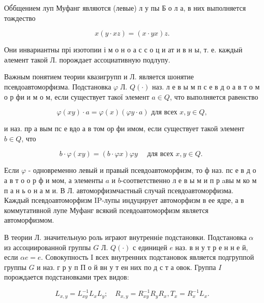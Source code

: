 \documentclass[10pt]{article}
\begin{document}
Об́бщением луп Муфанг являются (левые) л у пы Б о л а, в них выполняется тождество



\[

x(y \cdot x z)=(x \cdot y x) z .

\]



Они инвариантны прі изотопии і м о н о а с с о ц и ат и в н ы, т. е. каждыӥ әлемент такой Л. порождает ассоциативную подлупу.



Важным понятием теории квазигрупп и Л. является шонятие псевдоавтоморфизма. Подстановка $\varphi$ Л. $Q(\cdot)$ наз. л е в ы м п с е в д о а в т о м о р фи и м о м, если существует такої элемент $a \in Q$, что выполняется равенство



\[

\varphi(x y) \cdot a=\varphi(x)(\varphi y \cdot a) \text { для всех } x, y \in Q,

\]



и наз. пр а вым пс е вдо а в том ор фи имом, если существует такой элемент $b \in Q$, что



\[

b \cdot \varphi(x y)=(b \cdot \varphi x) \varphi y \quad \text { для всех } x, y \in Q \text {. }

\]



Если $\varphi$ - одновременно левый и правый псевдоавтоморфизм, то ф наз. пс е в д о а в т о о р ф и мом, а элементы $a$ и $b$-соответственно л е в ы м и п р aвы м ко м п а н ь о н а м и. В Л. автоморфизмчастный случай псевдоавтоморфизма. Каждый псевдоавтоморфизм IP-лупы индуцирует автоморфизм в ее ядре, а в коммутативной лупе Муфанг всякий псевдоавтоморфизм является автоморфизмом.



В теории Л. значительную роль играют внутренніе подстановки. Подстановка $\alpha$ из ассоциированной группы $G$ Л. $Q(\cdot)$ с единицей $e$ наз. в н у т р е н н е й, если $\alpha e=e$. Совокупность I всех внутренних подстановок является подгруппой группы $G$ и наз. г р у п П о й вн у т ен них по д с т а овок. Группа $I$ порождается подстановками трех видов:



\[

L_{x, y}=L_{x y}^{-1} L_{x} L_{y} ; \quad R_{x, y}=R_{x y}^{-1} R_{y} R_{x}, T_{x}=R_{x}^{-1} L_{x} .

\]
\end{document}
